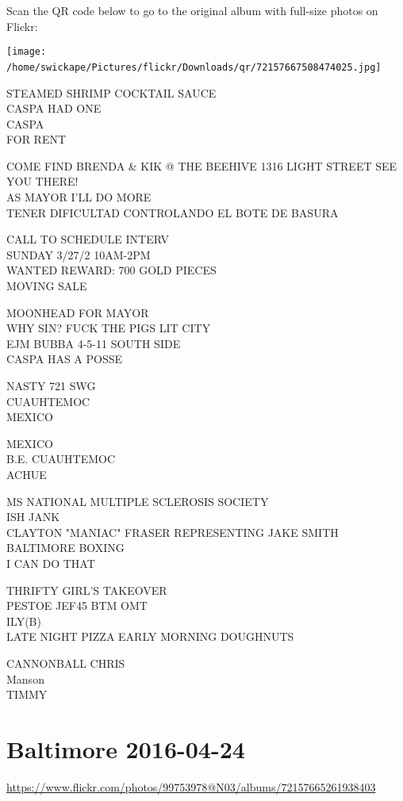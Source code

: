 \documentclass[10pt,letterpaper]{article}
\begin{document}
Scan the QR code below to go to the original album with full-size photos on Flickr:

\texttt{[image: /home/swickape/Pictures/flickr/Downloads/qr/72157667508474025.jpg]}
\

STEAMED SHRIMP COCKTAIL SAUCE\\
CASPA HAD ONE\\
CASPA\\
FOR RENT

COME FIND BRENDA \& KIK @ THE BEEHIVE 1316 LIGHT STREET SEE YOU THERE!\\
AS MAYOR I'LL DO MORE\\
TENER DIFICULTAD CONTROLANDO EL BOTE DE BASURA

CALL TO SCHEDULE INTERV\\
SUNDAY 3/27/2 10AM{-}2PM\\
WANTED REWARD: 700 GOLD PIECES\\
MOVING SALE

MOONHEAD FOR MAYOR\\
WHY SIN?  FUCK THE PIGS LIT CITY\\
EJM BUBBA 4{-}5{-}11 SOUTH SIDE\\
CASPA HAS A POSSE

NASTY 721 SWG\\
CUAUHTEMOC\\
MEXICO

MEXICO\\
B.E. CUAUHTEMOC\\
ACHUE

MS NATIONAL MULTIPLE SCLEROSIS SOCIETY\\
ISH JANK\\
CLAYTON "MANIAC" FRASER REPRESENTING JAKE SMITH BALTIMORE BOXING\\
I CAN DO THAT

THRIFTY GIRL'S TAKEOVER\\
PESTOE JEF45 BTM OMT\\
ILY(B)\\
LATE NIGHT PIZZA EARLY MORNING DOUGHNUTS

CANNONBALL CHRIS\\
Manson\\
TIMMY
\

\section*{Baltimore 2016-04-24}

\url{https://www.flickr.com/photos/99753978@N03/albums/72157665261938403}
\end{document}
